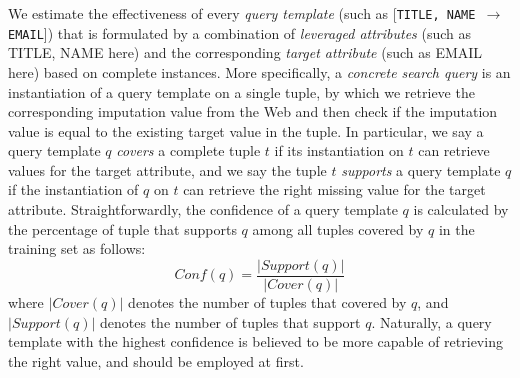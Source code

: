 \documentclass[sigconf]{acmart}
\begin{document}
We estimate the effectiveness of every {\em query template} (such as  [{\tt TITLE, NAME $\to$ EMAIL}]) that is formulated by a combination of {\em leveraged attributes} (such as TITLE, NAME here) and the corresponding {\em target attribute} (such as EMAIL here) based on complete instances.
%
More specifically, a {\em concrete search query} is an instantiation of a query template on a single tuple, by which we retrieve the  corresponding imputation value from the Web and then check if the imputation value is equal to the existing target value in the tuple.
%
In particular, we say a query template $q$ {\em covers} a complete tuple $t$ if its instantiation on $t$ can retrieve values for the target attribute, and we say the tuple $t$ {\em supports} a query template $q$ if the instantiation of $q$ on $t$ can retrieve the right missing value for the target attribute. Straightforwardly, the confidence of a query template $q$ is calculated by the percentage of tuple that supports $q$ among all tuples covered by $q$ in the training set as follows:
\begin{equation}
Conf(q)=\frac{|Support(q)|}{|Cover(q)|}
\end{equation}
where $|Cover(q)|$ denotes the number of tuples that covered by $q$, and $|Support(q)|$ denotes the number of tuples that support $q$. Naturally, a query template with the highest confidence is believed to be more capable of retrieving the right value, and should be employed at first.


\end{document}
